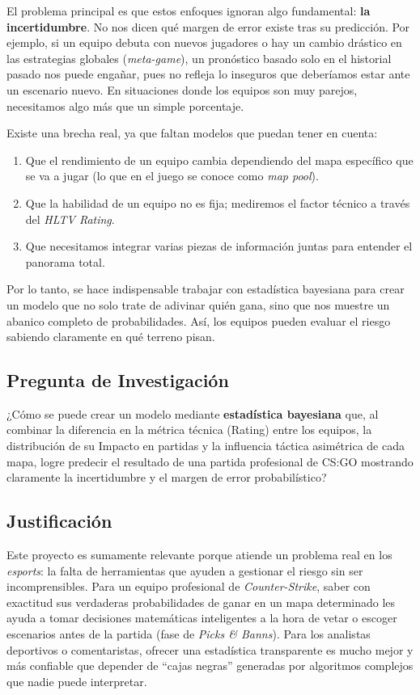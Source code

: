 \documentclass[twocolumn,10pt]{article}
\begin{document}
El problema principal es que estos enfoques ignoran algo fundamental: \textbf{la incertidumbre}. No nos dicen qué margen de error existe tras su predicción. Por ejemplo, si un equipo debuta con nuevos jugadores o hay un cambio drástico en las estrategias globales (\textit{meta-game}), un pronóstico basado solo en el historial pasado nos puede engañar, pues no refleja lo inseguros que deberíamos estar ante un escenario nuevo. En situaciones donde los equipos son muy parejos, necesitamos algo más que un simple porcentaje.

Existe una brecha real, ya que faltan modelos que puedan tener en cuenta:
\begin{enumerate}[noitemsep]
    \item Que el rendimiento de un equipo cambia dependiendo del mapa específico que se va a jugar (lo que en el juego se conoce como \textit{map pool}).
    \item Que la habilidad de un equipo no es fija; mediremos el factor técnico a través del \textit{HLTV Rating}.
    \item Que necesitamos integrar varias piezas de información juntas para entender el panorama total.
\end{enumerate}

Por lo tanto, se hace indispensable trabajar con estadística bayesiana para crear un modelo que no solo trate de adivinar quién gana, sino que nos muestre un abanico completo de probabilidades. Así, los equipos pueden evaluar el riesgo sabiendo claramente en qué terreno pisan.

\subsection{Pregunta de Investigación}

¿Cómo se puede crear un modelo mediante \textbf{estadística bayesiana} que, al combinar la diferencia en la métrica técnica (Rating) entre los equipos, la distribución de su Impacto en partidas y la influencia táctica asimétrica de cada mapa, logre predecir el resultado de una partida profesional de CS:GO mostrando claramente la incertidumbre y el margen de error probabilístico?

\subsection{Justificación}

Este proyecto es sumamente relevante porque atiende un problema real en los \textit{esports}: la falta de herramientas que ayuden a gestionar el riesgo sin ser incomprensibles. Para un equipo profesional de \textit{Counter-Strike}, saber con exactitud sus verdaderas probabilidades de ganar en un mapa determinado les ayuda a tomar decisiones matemáticas inteligentes a la hora de vetar o escoger escenarios antes de la partida (fase de \textit{Picks \& Banns}). Para los analistas deportivos o comentaristas, ofrecer una estadística transparente es mucho mejor y más confiable que depender de ``cajas negras'' generadas por algoritmos complejos que nadie puede interpretar.
\end{document}
